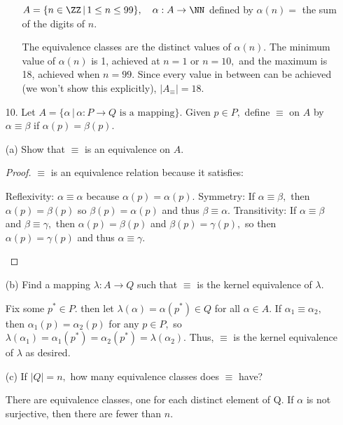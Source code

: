 \documentclass{article}
\begin{document}
\begin{itemize}
\begin{enumerate}[(i)]
\begin{soln}
					\end{soln}

				\ii $A=\{n\in\ZZ\, \vert\, 1\le n\le99\}, \quad\alpha:A\to\NN$ defined by $\alpha(n) =$ the sum of the digits of $n.$
					\begin{soln}
						The equivalence classes are the distinct values of $\alpha(n).$ The minimum value of $\alpha(n)$ is 1, achieved at $n=1$ or $n=10,$ and the maximum is 18, achieved when $n=99.$ Since every value in between can be achieved (we won't show this explicitly), $\vert A_{\equiv}\vert=\boxed{18.}$

					\end{soln}
		\end{enumerate}

	\item[10.] Let $A=\{\alpha\, \big\vert \, \alpha:P\to Q\text{ is a mapping}\}.$ Given $p\in P,$ define $\equiv$ on $A$ by $\alpha\equiv\beta$ if $\alpha(p)=\beta(p).$

		(a) Show that $\equiv$ is an equivalence on $A.$
			\begin{proof}
				$\equiv$ is an equivalence relation because it satisfies:
				\begin{enumerate}
					\ii Reflexivity: $\alpha\equiv\alpha$ because $\alpha(p)=\alpha(p).$
					\ii Symmetry: If $\alpha\equiv\beta,$ then $\alpha(p)=\beta(p)$ so $\beta(p)=\alpha(p)$ and thus $\beta\equiv\alpha.$
					\ii Transitivity: If $\alpha\equiv\beta$ and $\beta\equiv\gamma,$ then $\alpha(p)=\beta(p)$ and $\beta(p)=\gamma(p),$ so then $\alpha(p)=\gamma(p)$ and thus $\alpha\equiv\gamma.$
				\end{enumerate}
			\end{proof}

		(b) Find a mapping $\lambda:A\to Q$ such that $\equiv$ is the kernel equivalence of $\lambda.$
			\begin{soln}
				Fix some $p^*\in P.$ then let $\lambda(\alpha)=\alpha(p^*)\in Q$ for all $\alpha\in A.$ If $\alpha_1\equiv\alpha_2,$ then $\alpha_1(p)=\alpha_2(p)$ for any $p\in P,$ so $\lambda(\alpha_1)=\alpha_1(p^*)=\alpha_2(p^*)=\lambda(\alpha_2).$ Thus, $\equiv$ is the kernel equivalence of $\lambda$ as desired.

			\end{soln}

		(c) If $\vert Q\vert=n,$ how many equivalence classes does $\equiv$ have?
			\begin{soln}
				There are  equivalence classes, one for each distinct element of Q. If $\alpha$ is not surjective, then there are fewer than $n.$

			\end{soln}
\end{itemize}
\end{document}
